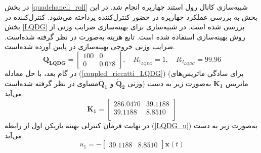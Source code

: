 در بخش
\ref{quadchanell_roll}
شبیه‌سازی کانال رول استند چهارپره انجام شد. در این بخش به بررسی عملکرد چهارپره در حضور کنترل‌کننده  پرداخته می‌شود. کنترل‌کننده  در بخش
\ref{LQDG}
بررسی شده است.
 در شبیه‌سازی برای بهینه‌سازی ضرایب وزنی  از روش بهینه‌سازی
 \cite{Karimi2010}
استفاده شده است.
تابع هزینه  به‌صورت
در نظر گرفته شده‌است. ضرایب وزنی خروجی بهینه‌سازی در پایین آورده شده‌است.
\begin{equation}
	\boldsymbol{Q_{LQDG}} = \begin{bmatrix}
		100 & 0\\
		0 & 0.078
	\end{bmatrix}, \quad R_{1_{LQDG}} =  1, \quad R_{2_{LQDG}} =  99.96
\end{equation}
در گام بعد، با حل معادله
(\ref{coupled_riccatti_LQDG})
(برای سادگی ماتریس‌های وزنی $\boldsymbol{\dot{Q}_{2}}$ و $\boldsymbol{\dot{Q}_{1}}$مساوی در نظر گرفته شده‌است)
ماتریس
$\boldsymbol{\dot{K}_1}$
به‌صورت زیر به دست می‌آید.
\begin{equation}
	\boldsymbol{K_1} = \begin{bmatrix}
		
		286.0470  & 39.1188\\
		39.1188   & 8.8510\\
	\end{bmatrix}
\end{equation}
در نهایت فرمان کنترلی بهینه بازیکن اول از رابطه
(\ref{LQDG_u})
به‌صورت زیر به دست می‌آید.
\begin{equation}
	u_1 = -\begin{bmatrix}
		39.1188   & 8.8510
	\end{bmatrix}\boldsymbol{x}(t)
\end{equation}

